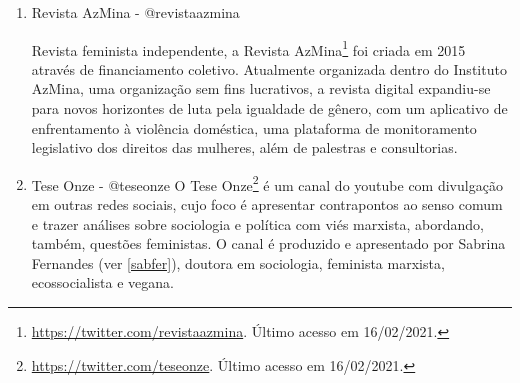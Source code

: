 \documentclass[
	12pt,				%
	openright,			%
	twoside,			%
	a4paper,			%
	english,			%
	brazil				%
	]{abntex2}
\begin{document}
\begin{anexosenv}
\begin{enumerate}
 A ONU Mulheres, criada em 2010, tem o objetivo de unir, fortalecer e ampliar os esforços mundiais em defesa dos direitos humanos das mulheres. A organização atua como secretariado da Comissão da ONU sobre a Situação das Mulheres (CSW), que se reúne, no mês de março, em Nova Iorque, há mais de 60 anos. A comissão é uma das principais instâncias de negociação e de monitoramento de compromissos internacionais sobre direitos humanos das mulheres. Os encontros anuais contam com autoridades dos mecanismos das mulheres, sociedade civil e especialistas. O escritório do Brasil da ONU Mulheres\footnote{\url{https://twitter.com/ONUMulheresBR}. Último acesso em 16/02/2021.} opera em Brasília.

 \item Revista AzMina - @revistaazmina
 
 Revista feminista independente, a Revista AzMina\footnote{\url{https://twitter.com/revistaazmina}. Último acesso em 16/02/2021.} foi criada em 2015 através de financiamento coletivo. Atualmente organizada dentro do Instituto AzMina, uma organização sem fins lucrativos, a revista digital expandiu-se para novos horizontes de luta pela igualdade de gênero, com um aplicativo de enfrentamento à violência doméstica, uma plataforma de monitoramento legislativo dos direitos das mulheres, além de palestras e consultorias.

 \item Tese Onze - @teseonze
 O Tese Onze\footnote{\url{https://twitter.com/teseonze}. Último acesso em 16/02/2021.} é um canal do youtube com divulgação em outras redes sociais, cujo foco é apresentar contrapontos ao senso comum e trazer análises sobre sociologia e política com viés marxista, abordando, também, questões feministas. O canal é produzido e apresentado por Sabrina Fernandes (ver \ref{sabfer}), doutora em sociologia, feminista marxista, ecossocialista e vegana.
 
 \end{enumerate}
 

\end{anexosenv}
\end{document}
